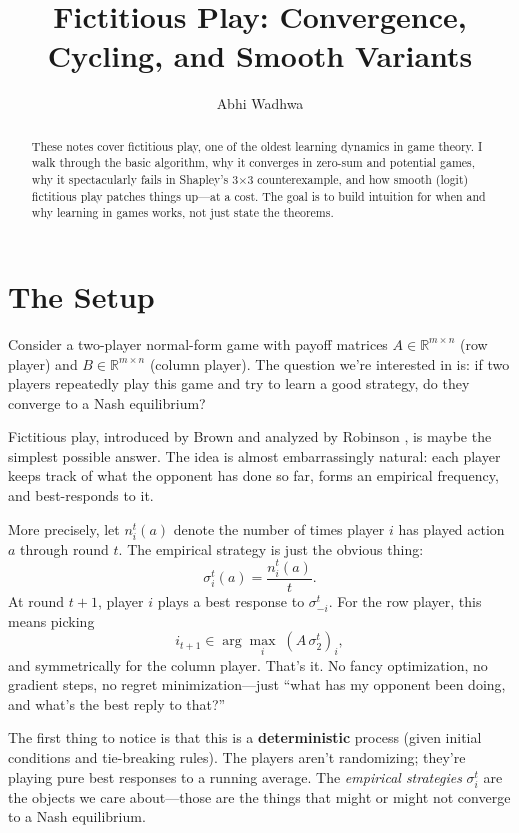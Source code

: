 \documentclass[11pt]{article}
\title{Fictitious Play: Convergence, Cycling, and Smooth Variants}
\author{Abhi Wadhwa}
\date{}
\begin{document}
\maketitle

\begin{abstract}
These notes cover fictitious play, one of the oldest learning dynamics in game theory. I walk through the basic algorithm, why it converges in zero-sum and potential games, why it spectacularly fails in Shapley's 3$\times$3 counterexample, and how smooth (logit) fictitious play patches things up---at a cost. The goal is to build intuition for when and why learning in games works, not just state the theorems.
\end{abstract}

\section{The Setup}

Consider a two-player normal-form game with payoff matrices $A \in \mathbb{R}^{m \times n}$ (row player) and $B \in \mathbb{R}^{m \times n}$ (column player). The question we're interested in is: if two players repeatedly play this game and try to learn a good strategy, do they converge to a Nash equilibrium?

Fictitious play, introduced by Brown \cite{brown1951} and analyzed by Robinson \cite{robinson1951}, is maybe the simplest possible answer. The idea is almost embarrassingly natural: each player keeps track of what the opponent has done so far, forms an empirical frequency, and best-responds to it.

More precisely, let $n_i^t(a)$ denote the number of times player $i$ has played action $a$ through round $t$. The empirical strategy is just the obvious thing:
\[
\sigma_i^t(a) = \frac{n_i^t(a)}{t}.
\]
At round $t+1$, player $i$ plays a best response to $\sigma_{-i}^t$. For the row player, this means picking
\[
i_{t+1} \in \arg\max_i \; (A \, \sigma_2^t)_i,
\]
and symmetrically for the column player. That's it. No fancy optimization, no gradient steps, no regret minimization---just ``what has my opponent been doing, and what's the best reply to that?''

The first thing to notice is that this is a \textbf{deterministic} process (given initial conditions and tie-breaking rules). The players aren't randomizing; they're playing pure best responses to a running average. The \emph{empirical strategies} $\sigma_i^t$ are the objects we care about---those are the things that might or might not converge to a Nash equilibrium.
\end{document}
